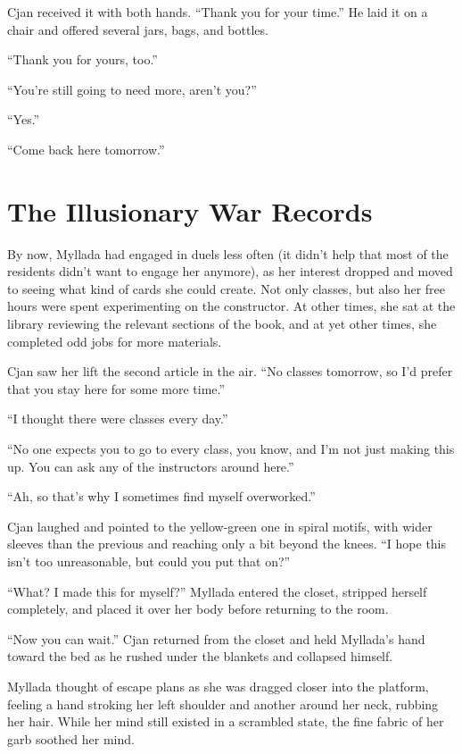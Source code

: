 Cjan received it with both hands. ``Thank you for your time.'' He laid it on a chair and offered several jars, bags, and bottles.

``Thank you for yours, too.''

``You're still going to need more, aren't you?''

``Yes.''

``Come back here tomorrow.''

\chapter{The Illusionary War Records}

By now, Myllada had engaged in duels less often (it didn't help that most of the residents didn't want to engage her anymore), as her interest dropped and moved to seeing what kind of cards she could create. Not only classes, but also her free hours were spent experimenting on the constructor. At other times, she sat at the library reviewing the relevant sections of the book, and at yet other times, she completed odd jobs for more materials.

Cjan saw her lift the second article in the air. ``No classes tomorrow, so I'd prefer that you stay here for some more time.''

``I thought there were classes every day.''

``No one expects you to go to every class, you know, and I'm not just making this up. You can ask any of the instructors around here.''

``Ah, so that's why I sometimes find myself overworked.''

Cjan laughed and pointed to the yellow-green one in spiral motifs, with wider sleeves than the previous and reaching only a bit beyond the knees. ``I hope this isn't too unreasonable, but could you put that on?''

``What? I made this for myself?'' Myllada entered the closet, stripped herself completely, and placed it over her body before returning to the room.

``Now you can wait.'' Cjan returned from the closet and held Myllada's hand toward the bed as he rushed under the blankets and collapsed himself.

Myllada thought of escape plans as she was dragged closer into the platform, feeling a hand stroking her left shoulder and another around her neck, rubbing her hair. While her mind still existed in a scrambled state, the fine fabric of her garb soothed her mind.

